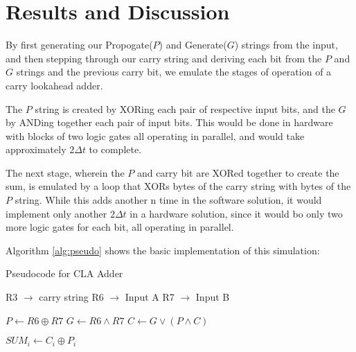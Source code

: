 \documentclass[journal]{IEEEtran}
\begin{document}
\section{Results and Discussion}\label{sec:discuss}

By first generating our Propogate($P$) and Generate($G$) strings from the input,
and then stepping through our carry string and deriving each bit from the
$P$ and $G$ strings and the previous carry bit, we emulate the stages of
operation of a carry lookahead adder.

The $P$ string is created by XORing each pair of respective input bits, and the
$G$ by ANDing together each pair of input bits. This would be done in hardware
with blocks of two logic gates all operating in parallel, and would take
approximately $2\Delta t$ to complete.

The next stage, wherein the $P$ and carry bit are XORed together to create the
sum, is emulated by a loop that XORs bytes of the carry string with bytes of
the $P$ string. While this adds another n time in the software solution, it
would implement only another $2\Delta t$ in a hardware solution, since it would
bo only two more logic gates for each bit, all operating in parallel.

Algorithm \ref{alg:pseudo}
shows the basic implementation of this simulation:
\begin{algorithm}[H]
\caption{Pseudocode for CLA Adder}
\label{alg:pseudo}
\begin{algorithmic}
\State R3 $\rightarrow$ carry string
\State R6 $\rightarrow$ Input A
\State R7 $\rightarrow$ Input B

	\State $P \gets R6 \oplus R7$
	\State $G \gets R6 \land R7$
\EndFor
{}
	\State $C \gets G \lor (P \land C)$
\EndFor

	\State $SUM_i \gets C_i \oplus P_i$
\EndFor
\end{algorithmic}
\end{algorithm}
\end{document}

